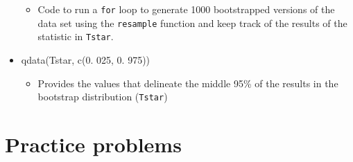 \documentclass[]{book}
\providecommand{\tightlist}{%
  \setlength{\itemsep}{0pt}\setlength{\parskip}{0pt}}
\begin{document}
\begin{itemize}
  \begin{itemize}
  \tightlist
  \item
    Code to run a \texttt{for} loop to generate 1000 bootstrapped
    versions of the data set using the \texttt{resample} function and
    keep track of the results of the statistic in \texttt{Tstar}.
  \end{itemize}
\item
  qdata(Tstar, c(0. 025, 0. 975))

  \begin{itemize}
  \tightlist
  \item
    Provides the values that delineate the middle 95\% of the results in
    the bootstrap distribution (\texttt{Tstar})
  \end{itemize}
\end{itemize}

\section{Practice problems}\label{section2-12}


\end{document}
